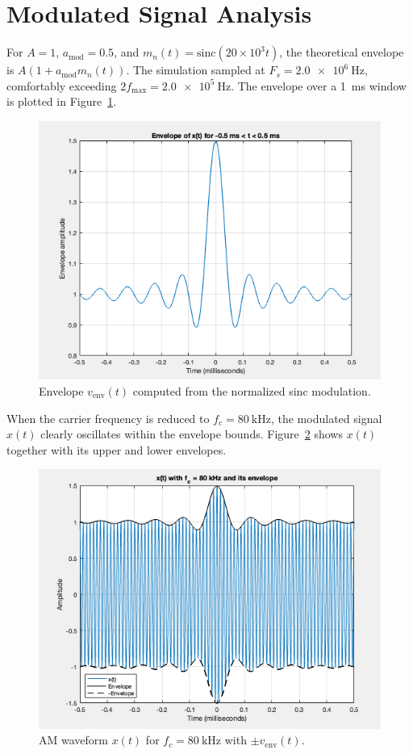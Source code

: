 \documentclass[12pt]{article}
\begin{document}
\clearpage
\section*{Modulated Signal Analysis}
For $A=1$, $a_\text{mod}=0.5$, and $m_n(t)=\mathrm{sinc}(20\times10^3 t)$, the theoretical envelope is $A\left(1+a_\text{mod}m_n(t)\right)$. The simulation sampled at $F_s = \SI{2.0e6}{\hertz}$, comfortably exceeding $2f_\text{max} = \SI{2.0e5}{\hertz}$. The envelope over a \SI{1}{\milli\second} window is plotted in Figure~\ref{fig:envelope}.

\begin{figure}[H]
    \centering
    \includegraphics[width=0.9\linewidth]{Figure 3 Task 7.png}
    \caption{Envelope $v_\text{env}(t)$ computed from the normalized sinc modulation.}
    \label{fig:envelope}
\end{figure}

When the carrier frequency is reduced to $f_c = \SI{80}{\kilo\hertz}$, the modulated signal $x(t)$ clearly oscillates within the envelope bounds. Figure~\ref{fig:xt} shows $x(t)$ together with its upper and lower envelopes.

\begin{figure}[H]
    \centering
    \includegraphics[width=0.9\linewidth]{Figure 4 Task 8.png}
    \caption{AM waveform $x(t)$ for $f_c=\SI{80}{\kilo\hertz}$ with $\pm v_\text{env}(t)$.}
    \label{fig:xt}
\end{figure}
\end{document}
